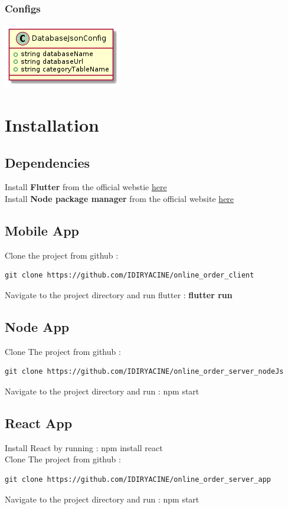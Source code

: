 \documentclass{article}
\begin{document}
\subsubsection{Configs}
\includegraphics[scale=1]{./out/NodeApp/Database/SharedConfigFile.png}


\section{Installation}
\subsection{Dependencies}
Install \textbf{Flutter} from the official webstie \href{https://docs.flutter.dev/get-started/install}{here}\\
Install \textbf{Node package manager} from the official website \href{https://docs.npmjs.com/downloading-and-installing-node-js-and-npm}{here}\\
\subsection{Mobile App}
Clone the project from github :
\begin{verbatim}
git clone https://github.com/IDIRYACINE/online_order_client
\end{verbatim}
Navigate to the project directory and run flutter : \textbf{flutter run} 
\subsection{Node App}
Clone The project from github :
\begin{verbatim}
git clone https://github.com/IDIRYACINE/online_order_server_nodeJs
\end{verbatim}
Navigate to the project directory and run : npm start 
\subsection{React App}
Install React by running : npm install react \\
Clone The project from github : 
\begin{verbatim}
git clone https://github.com/IDIRYACINE/online_order_server_app
\end{verbatim}
Navigate to the project directory and run : npm start 
\end{document}
